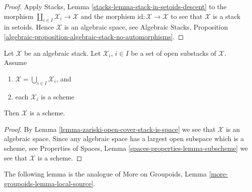 \begin{proof}
Apply
Stacks, Lemma \ref{stacks-lemma-stack-in-setoids-descent}
to the morphism $\coprod_{i \in I} \mathcal{X}_i \to \mathcal{X}$
and the morphism $\text{id} : \mathcal{X} \to \mathcal{X}$ to
see that $\mathcal{X}$ is a stack in setoids.
Hence $\mathcal{X}$ is an algebraic space, see
Algebraic Stacks,
Proposition \ref{algebraic-proposition-algebraic-stack-no-automorphisms}.
\end{proof}

\begin{lemma}
\label{lemma-zariski-open-cover-stack-is-scheme}
Let $\mathcal X$ be an algebraic stack.
Let $\mathcal{X}_i$, $i \in I$ be a set of open substacks of $\mathcal{X}$.
Assume
\begin{enumerate}
\item $\mathcal{X} = \bigcup_{i \in I} \mathcal{X}_i$, and
\item each $\mathcal{X}_i$ is a scheme
\end{enumerate}
Then $\mathcal{X}$ is a scheme.
\end{lemma} 

\begin{proof}
By
Lemma \ref{lemma-zariski-open-cover-stack-is-space}
we see that $\mathcal{X}$ is an algebraic space. Since any algebraic
space has a largest open subspace which is a scheme, see
Properties of Spaces, Lemma \ref{spaces-properties-lemma-subscheme}
we see that $\mathcal{X}$ is a scheme.
\end{proof}


\noindent
The following lemma is the analogue of
More on Groupoids, Lemma \ref{more-groupoids-lemma-local-source}.

